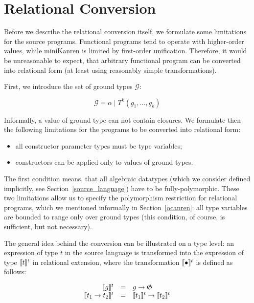 \section{Relational Conversion}
\label{conversion}
\def\arraystretch{1}

Before we describe the relational conversion itself, we formulate some limitations for the source
programs. Functional programs tend to operate with higher-order values, while miniKanren is
limited by first-order unification. Therefore, it would be unreasonable to expect, that arbitrary
functional program can be converted into relational form (at least using reasonably simple 
transformations). 

First, we introduce the set of ground types $\mathcal G$:

$$
\mathcal G=\alpha \mid T^k(g_1,\dots,g_k)
$$

Informally, a value of ground type can not contain closures. We formulate then the following limitations for
the programs to be converted into relational form:

\begin{itemize}
  \item all constructor parameter types must be type variables;
  \item constructors can be applied only to values of ground types.
\end{itemize}

The first condition means, that all algebraic datatypes (which we consider defined implicitly, see Section~\ref{source_language}) 
have to be fully-polymorphic. These two limitations allow us to specify the polymorphism restriction for 
relational programs, which we mentioned informally in Section~\ref{ocanren}: all type variables are bounded to
range only over ground types (this condition, of course, is sufficient, but not necessary).

The general idea behind the conversion can be illustrated on a type level: an expression of type $t$ in the source
language is transformed into the expression of type $\llbracket{t}\rrbracket^t$ in relational extension, where
the transformation $\llbracket{\bullet}\rrbracket^t$ is defined as follows:

$$
\begin{array}{rcl}
\llbracket{g}\rrbracket^t                     & = & g \to \mathfrak G \\
\llbracket{t_1 \to t_2}\rrbracket^t           & = & \llbracket{t_1}\rrbracket^t \to \llbracket{t_2}\rrbracket^t \\
\end{array}
$$

